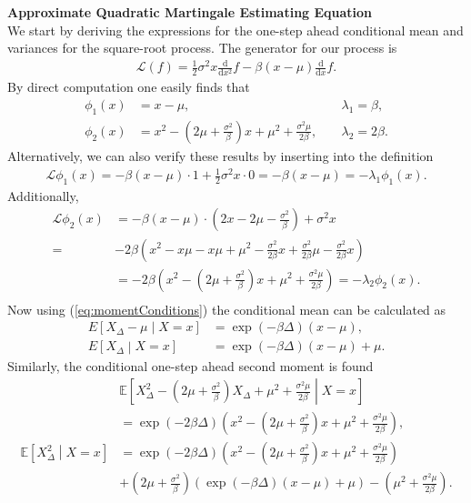 \noindent \textbf{Approximate Quadratic Martingale Estimating Equation}\\
We start by deriving the expressions for the one-step ahead conditional mean and variances for the square-root process. The generator for our process is
\begin{align}
    \mathcal{L}(f) = \frac{1}{2}\sigma^2x\frac{\mathrm{d}}{\mathrm{d}x^2}f -\beta\left(x - \mu\right)\frac{\mathrm{d}}{\mathrm{d}x}f.
\end{align}
By direct computation one easily finds that 
\begin{align}
    \phi_1(x) &= x-\mu, &&\; \lambda_1 = \beta, \label{squarerooteigen1}\\
    \phi_2(x) &= x^2 - \left(2\mu + \frac{\sigma^2}{\beta}\right)x + \mu^2 + \frac{\sigma^2\mu}{2\beta}, &&\; \lambda_2 = 2\beta. \label{squarerooteigen2}
\end{align}
Alternatively, we can also verify these results by inserting into the definition
\begin{align}
    \mathcal{L}\phi_1(x) = -\beta\left(x - \mu\right)\cdot 1 + \frac{1}{2}\sigma^2 x \cdot 0 = -\beta\left(x - \mu\right) = -\lambda_1\phi_1(x).
\end{align}
Additionally,
\begin{align}
    \mathcal{L}\phi_2(x) &= -\beta\left(x - \mu\right)\cdot \left(2x -2\mu - \frac{\sigma^2}{\beta}\right) + \sigma^2x\\
    =& -2\beta\left(x^2-x\mu - x\mu + \mu^2 -\frac{\sigma^2}{2\beta}x + \frac{\sigma^2}{2\beta}\mu - \frac{\sigma^2}{2\beta}x \right)\\
    &= -2\beta \left(x^2 -\left(2\mu+\frac{\sigma^2}{\beta}\right)x + \mu^2 + \frac{\sigma^2\mu}{2\beta}\right) = -\lambda_2\phi_2(x).\\
\end{align}
Now using (\ref{eq:momentConditions}) the conditional mean can be calculated as
\begin{align}
    E\left[X_\Delta - \mu \middle| X = x\right] &= \exp\left(-\beta\Delta\right)\left(x-\mu\right),\\
    E\left[X_\Delta \middle| X = x\right] &= \exp\left(-\beta\Delta\right)\left(x-\mu\right) + \mu. \label{squarerootCondMean}
\end{align}
Similarly, the conditional one-step ahead second moment is found
\begin{align}
    &\mathbb{E}\left[X_\Delta^2 - \left(2\mu + \frac{\sigma^2}{\beta}\right)X_\Delta + \mu^2 + \frac{\sigma^2\mu}{2\beta} \middle| X = x \right] \nonumber \\
    &= \exp\left(-2\beta \Delta\right)\left(x^2 - \left(2\mu + \frac{\sigma^2}{\beta}\right)x + \mu^2 + \frac{\sigma^2 \mu}{2\beta}\right),\\
    \mathbb{E}\left[X_\Delta^2 \middle| X = x\right] &= \exp\left(-2\beta \Delta\right)\left(x^2 - \left(2\mu + \frac{\sigma^2}{\beta}\right)x + \mu^2 + \frac{\sigma^2 \mu}{2\beta}\right)  \nonumber  \\
     &+ \left(2\mu + \frac{\sigma^2}{\beta}\right) \left(\exp\left(-\beta\Delta\right)\left(x-\mu\right) + \mu\right) - \left(\mu^2 + \frac{\sigma^2\mu}{2\beta}\right). \label{squarerootCondsecondMoment}
\end{align}

